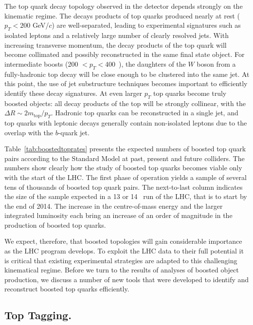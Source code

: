 The top quark decay topology observed in the detector depends strongly on the
kinematic regime.  The decays products of top quarks produced nearly at rest 
($p_T < 200$ GeV/$c$) are well-separated, leading to experimental signatures
such as isolated leptons and a relatively large number of clearly resolved 
jets. With increasing transverse momentum, the decay products 
of the top quark will become collimated and possibly reconstructed in the 
same final state object. For intermediate boosts (200 $< p_T < $400~\gev{}), 
the daughters of the $W$ boson from a fully-hadronic top decay will be close 
enough to be clustered into the same jet.  At this point, the use of jet 
substructure techniques becomes important to efficiently identify these decay 
signatures. At even larger $p_T$ top quarks become truly boosted objects: 
all decay products of the top will be 
strongly collinear, with the $\Delta R \sim 2 m_{\mathrm{top}} / p_T$.  
Hadronic top quarks can be reconstructed in a single 
jet, and top quarks with leptonic decays generally contain non-isolated 
leptons due to the overlap with the $b$-quark jet.  




Table~\ref{tab:boostedtoprates} presents the expected numbers of 
boosted top quark pairs according to the Standard Model at past, present and 
future colliders. The numbers show clearly how the study of boosted top quarks 
becomes viable only with the start of the LHC. The first phase of operation
yields a sample of several tens of thousands of boosted top quark pairs.
The next-to-last column indicates the size of the 
sample expected in a 13 or 14~\tev{} run of the LHC, that is to start 
by the end of 2014. The increase in the centre-of-mass 
energy and the larger integrated luminosity each bring an increase 
of an order of magnitude in the production of boosted top quarks. 


We expect, therefore, that boosted topologies will gain considerable importance 
as the LHC program develops. To exploit the LHC data to their full potential it 
is  critical that existing experimental strategies are adapted to this
challenging kinematical regime. Before we turn to the results of 
analyses of boosted object production, we discuss a number of new tools
that were developed to identify and reconstruct boosted top quarks efficiently. 


\subsection{Top Tagging.}  

